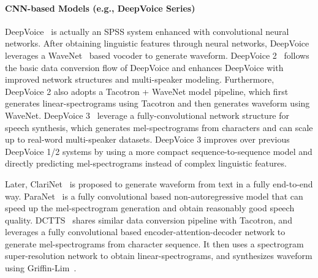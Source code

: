 \documentclass{article}
\begin{document}
\paragraph{CNN-based Models (e.g., DeepVoice Series)}
DeepVoice~\cite{arik2017deep} is actually an SPSS system enhanced with convolutional neural networks. After obtaining linguistic features through neural networks, DeepVoice leverages a WaveNet~\cite{oord2016wavenet} based vocoder to generate waveform. DeepVoice 2~\cite{gibiansky2017deep} follows the basic data conversion flow of DeepVoice and enhances DeepVoice with improved network structures and multi-speaker modeling. Furthermore, DeepVoice 2 also adopts a Tacotron + WaveNet model pipeline, which first generates linear-spectrograms using Tacotron and then generates waveform using WaveNet. DeepVoice 3~\cite{ping2018deep} leverage a fully-convolutional network structure for speech synthesis, which generates mel-spectrograms from characters and can scale up to real-word multi-speaker datasets. DeepVoice 3 improves over previous DeepVoice 1/2 systems by using a more compact sequence-to-sequence model and directly predicting mel-spectrograms instead of complex linguistic features. 

Later, ClariNet~\cite{ping2018clarinet} is proposed to generate waveform from text in a fully end-to-end way. ParaNet~\cite{peng2020non} is a fully convolutional based non-autoregressive model that can speed up the mel-spectrogram generation and obtain reasonably good speech quality. DCTTS~\cite{tachibana2018efficiently} shares similar data conversion pipeline with Tacotron, and leverages a fully convolutional based encoder-attention-decoder network to generate mel-spectrograms from character sequence. It then uses a spectrogram super-resolution network to obtain linear-spectrograms, and synthesizes waveform using Griffin-Lim~\cite{griffin1984signal}. 
\end{document}
